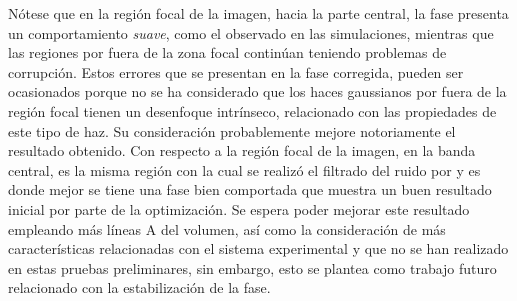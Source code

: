 Nótese que en la región focal de la imagen, hacia la parte central, la fase presenta un comportamiento \textit{suave}, como el observado en las simulaciones, mientras que las regiones por fuera de la zona focal continúan teniendo problemas de corrupción. Estos errores que se presentan en la fase corregida, pueden ser ocasionados porque no se ha considerado que los haces gaussianos por fuera de la región focal tienen un desenfoque intrínseco, relacionado con las propiedades de este tipo de haz. Su consideración probablemente mejore notoriamente el resultado obtenido. Con respecto a la región focal de la imagen, en la banda central, es la misma región con la cual se realizó el filtrado del ruido por \speckle y es donde mejor se tiene una fase bien comportada que muestra un buen resultado inicial por parte de la optimización. Se espera poder mejorar este resultado empleando más líneas A del volumen, así como la consideración de más características relacionadas con el sistema experimental y que no se han realizado en estas pruebas preliminares, sin embargo, esto se plantea como trabajo futuro relacionado con la estabilización de la fase.


